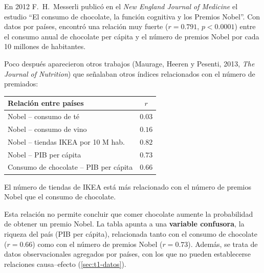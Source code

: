 \begin{ejemplo}
  En 2012 F.~H.~Messerli publicó en el \emph{New England Journal of Medicine} el estudio
  ``El consumo de chocolate, la función cognitiva y los Premios Nobel''. Con datos por
  países, encontró una relación muy fuerte ($r=0.791$, $p<0.0001$) entre el consumo anual de
  chocolate per cápita y el número de premios Nobel por cada 10 millones de habitantes.

  Poco después aparecieron otros trabajos (Maurage, Heeren y Pesenti, 2013, \emph{The Journal
  of Nutrition}) que señalaban otros índices relacionados con el número de premiados:
  \begin{center}
    \small
    \begin{tabular}{lc}
      \toprule
      Relación entre países & $r$ \\
      \midrule
      Nobel -- consumo de té            & $0.03$ \\
      Nobel -- consumo de vino          & $0.16$ \\
      Nobel -- tiendas IKEA por 10 M hab. & $0.82$ \\
      Nobel -- PIB per cápita           & $0.73$ \\
      Consumo de chocolate -- PIB per cápita & $0.66$ \\
      \bottomrule
    \end{tabular}
  \end{center}
  El número de tiendas de IKEA está más relacionado con el número de premios Nobel que el
  consumo de chocolate.

  Esta relación no permite concluir que comer chocolate aumente la probabilidad de obtener un
  premio Nobel. La tabla apunta a una \textbf{variable confusora}, la riqueza del país (PIB per
  cápita), relacionada tanto con el consumo de chocolate ($r=0.66$) como con el número de
  premios Nobel ($r=0.73$). Además, se trata de datos observacionales agregados por países,
  con los que no pueden establecerse relaciones causa--efecto (\cref{sec:t1-datos}).
\end{ejemplo}
